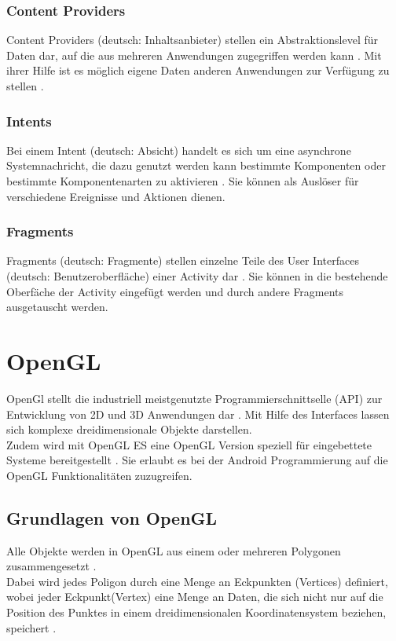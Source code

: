 \subsubsection{Content Providers}
Content Providers (deutsch: \glqq Inhaltsanbieter\grqq ) stellen ein Abstraktionslevel für Daten dar, auf die aus mehreren Anwendungen zugegriffen werden kann \citep{murphy:beginning-android}. Mit ihrer Hilfe ist es möglich eigene Daten anderen Anwendungen zur Verfügung zu stellen \citep{murphy:beginning-android}. 

\subsubsection{Intents}
Bei einem Intent (deutsch: \glqq Absicht\grqq ) handelt es sich um eine asynchrone Systemnachricht, die dazu genutzt werden kann bestimmte Komponenten oder bestimmte Komponentenarten zu aktivieren \citep{android:fundamentals}. Sie können als Auslöser für verschiedene Ereignisse und Aktionen dienen.

\subsubsection{Fragments}
Fragments (deutsch: \glqq Fragmente\grqq) stellen einzelne Teile des User Interfaces (deutsch: \glqq Benutzeroberfläche\grqq) einer Activity dar \citep{android:fragments}. Sie können in die bestehende Oberfäche der Activity eingefügt werden und durch andere Fragments ausgetauscht werden.


\section{OpenGL}\label{OpenGL}
OpenGl stellt die industriell meistgenutzte Programmierschnittselle (API) zur Entwicklung von 2D und 3D Anwendungen dar \citep{khronos:opengl-overview}. Mit Hilfe des Interfaces lassen sich komplexe dreidimensionale Objekte darstellen. \\
Zudem wird mit OpenGL ES eine OpenGL Version speziell für eingebettete Systeme bereitgestellt \citep{android:opengl}. Sie erlaubt es bei der Android Programmierung auf die OpenGL Funktionalitäten zuzugreifen.

\subsection{Grundlagen von OpenGL}
Alle Objekte werden in OpenGL aus einem oder mehreren Polygonen zusammengesetzt \citep[S. 5]{shreiner:opengl}.\\
Dabei wird jedes Poligon durch eine Menge an Eckpunkten (Vertices) definiert, wobei jeder Eckpunkt(Vertex) eine Menge an Daten, die sich nicht nur auf die Position des Punktes in einem dreidimensionalen Koordinatensystem beziehen, speichert \citep{vries:learn-opengl-triangle}. 

